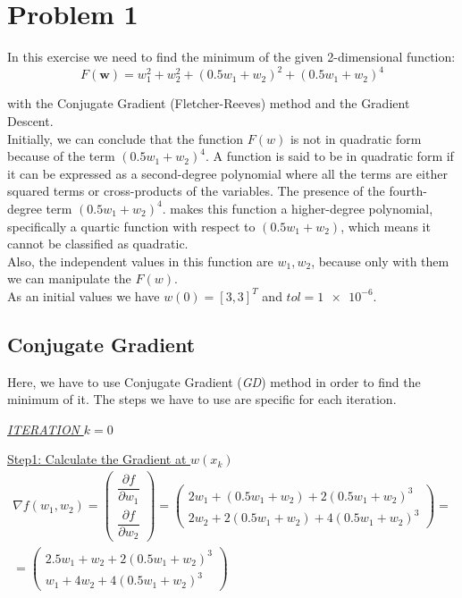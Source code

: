 \section{Problem 1}
In this exercise we need to find the minimum of the given 2-dimensional function:\\
\begin{equation}	
		F(\mathbf{w})=w_{1}^{2}+w_{2}^{2}+(0.5w_{1}+w_{2})^{2}+(0.5w_{1}+w_{2})^{4}	
		\label{eq:function1}
\end{equation}

with the Conjugate Gradient (Fletcher-Reeves) method and the Gradient Descent.\\

Initially, we can conclude that the function $F(w)$ is not in quadratic form because of the term $(0.5w_{1}+w_{2})^{4}$.
A function is said to be in quadratic form if it can be expressed as a second-degree polynomial where all the terms are either squared terms or cross-products of the variables. The presence of the fourth-degree term $(0.5w_{1}+w_{2})^{4}$.
makes this function a higher-degree polynomial, specifically a quartic function with respect to $(0.5w_{1}+w_{2})$, which means it cannot be classified as quadratic.\\
Also, the independent values in this function are $w_{1},w_{2}$, because only with them we can manipulate the $F(w)$.\\ 

As an initial values we have $w\left(0\right) = \left[3, 3\right]^T$ and  $tol=\num{1e-6}$.\\

\subsection{Conjugate Gradient}
Here, we have to use Conjugate Gradient (\textit{GD}) method in order to find the minimum of it.
The steps we have to use are specific for each iteration.

\begin{center}
	\underline{\textit{ITERATION} $k = 0$}
\end{center}

\underline{Step1: Calculate the Gradient at  $w\left(x_k\right)$ }\\
\[
\begin{gathered}
	\nabla f(w_1,w_2) = \left(\begin{array}{c}
		\dfrac{\partial f}{\partial w_1} \\[4mm]
		\dfrac{\partial f}{\partial w_2}
	\end{array}\right) = \left(\begin{array}{c}
		2w_1 + (0.5w_1+w_2) + 2(0.5w_1+w_2)^3\\[1mm]
		2w_2 + 2(0.5w_1+w_2) + 4(0.5w_1+w_2)^3
	\end{array}\right) =\\= \left(\begin{array}{c}
		2.5w_1 + w_2 + 2(0.5w_1+w_2)^3\\[1mm]
		w_1 + 4w_2 + 4(0.5w_1+w_2)^3
	\end{array}\right)
\end{gathered}
\]\\[3mm]

